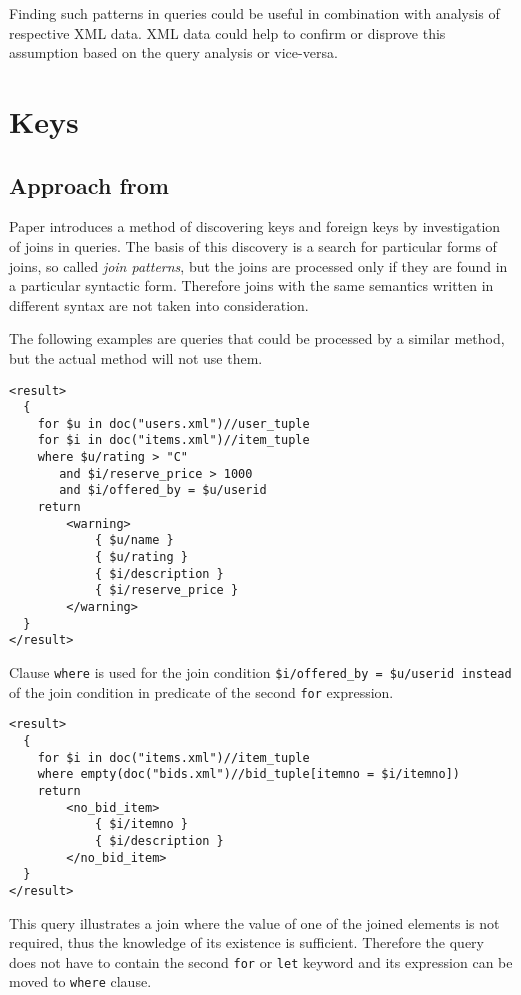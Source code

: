 Finding such patterns in queries could be useful in combination with analysis of respective XML data. XML data could help to confirm or disprove this assumption based on the query analysis or vice-versa.

\section{Keys}

\subsection{Approach from \cite{Necasky:2009:DXK:1529282.1529414}}
Paper \cite{Necasky:2009:DXK:1529282.1529414} introduces a method of discovering keys and foreign keys by investigation of joins in queries. The basis of this discovery is a search for particular forms of joins, so called \emph{join patterns}, but the joins are processed only if they are found in a particular syntactic form. Therefore joins with the same semantics written in different syntax are not taken into consideration.

The following examples are queries that could be processed by a similar method, but the actual method will not use them.

\begin{verbatim}
<result>
  {
    for $u in doc("users.xml")//user_tuple
    for $i in doc("items.xml")//item_tuple
    where $u/rating > "C" 
       and $i/reserve_price > 1000 
       and $i/offered_by = $u/userid
    return
        <warning>
            { $u/name }
            { $u/rating }
            { $i/description }
            { $i/reserve_price }
        </warning>
  }
</result>
\end{verbatim}

Clause \texttt{where} is used for the join condition \texttt{\$i/offered\_by = \$u/userid instead} of the join condition in predicate of the second \texttt{for} expression.

\begin{verbatim}
<result>
  {
    for $i in doc("items.xml")//item_tuple
    where empty(doc("bids.xml")//bid_tuple[itemno = $i/itemno])
    return
        <no_bid_item>
            { $i/itemno }
            { $i/description }
        </no_bid_item>
  }
</result>
\end{verbatim}

This query illustrates a join where the value of one of the joined elements is not required, thus the knowledge of its existence is sufficient. Therefore the query does not have to contain the second \texttt{for} or \texttt{let} keyword and its expression can be moved to \texttt{where} clause.

